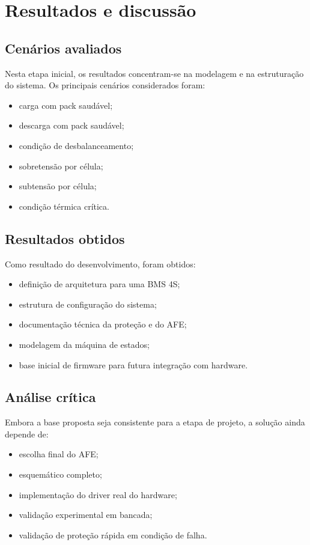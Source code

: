 \chapter{Resultados e discussão}

\section{Cenários avaliados}

Nesta etapa inicial, os resultados concentram-se na modelagem e na estruturação do sistema.
Os principais cenários considerados foram:

\begin{itemize}
  \item carga com pack saudável;
  \item descarga com pack saudável;
  \item condição de desbalanceamento;
  \item sobretensão por célula;
  \item subtensão por célula;
  \item condição térmica crítica.
\end{itemize}

\section{Resultados obtidos}

Como resultado do desenvolvimento, foram obtidos:

\begin{itemize}
  \item definição de arquitetura para uma BMS 4S;
  \item estrutura de configuração do sistema;
  \item documentação técnica da proteção e do AFE;
  \item modelagem da máquina de estados;
  \item base inicial de firmware para futura integração com hardware.
\end{itemize}

\section{Análise crítica}

Embora a base proposta seja consistente para a etapa de projeto, a solução ainda depende de:

\begin{itemize}
  \item escolha final do AFE;
  \item esquemático completo;
  \item implementação do driver real do hardware;
  \item validação experimental em bancada;
  \item validação de proteção rápida em condição de falha.
\end{itemize}
